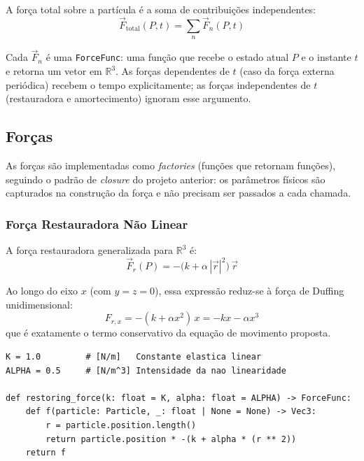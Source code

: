 A força total sobre a partícula é a soma de contribuições independentes:
\begin{equation}
    \vec{F}_\text{total}(P, t) = \sum_n \vec{F}_n(P, t)
\end{equation}

Cada $\vec{F}_n$ é uma \texttt{ForceFunc}: uma função que recebe o estado atual $P$ e o instante $t$ e retorna um vetor em $\mathbb{R}^3$. As forças dependentes de $t$ (caso da força externa periódica) recebem o tempo explicitamente; as forças independentes de $t$ (restauradora e amortecimento) ignoram esse argumento.

\subsection{Forças}

As forças são implementadas como \emph{factories} (funções que retornam funções), seguindo o padrão de \textit{closure} do projeto anterior: os parâmetros físicos são capturados na construção da força e não precisam ser passados a cada chamada.

\subsubsection{Força Restauradora Não Linear}

A força restauradora generalizada para $\mathbb{R}^3$ é:
\begin{equation}
    \vec{F}_r(P) = -\bigl(k + \alpha\,|\vec{r}|^2\bigr)\,\vec{r}
\end{equation}

Ao longo do eixo $x$ (com $y = z = 0$), essa expressão reduz-se à força de Duffing unidimensional:
\begin{equation}
    F_{r,x} = -(k + \alpha x^2)\,x = -kx - \alpha x^3
\end{equation}
que é exatamente o termo conservativo da equação de movimento proposta.

\begin{lstlisting}[caption={Força restauradora não linear como closure}, label={lst:2.restoring}]
K = 1.0         # [N/m]   Constante elastica linear
ALPHA = 0.5     # [N/m^3] Intensidade da nao linearidade

def restoring_force(k: float = K, alpha: float = ALPHA) -> ForceFunc:
    def f(particle: Particle, _: float | None = None) -> Vec3:
        r = particle.position.length()
        return particle.position * -(k + alpha * (r ** 2))
    return f
\end{lstlisting}

